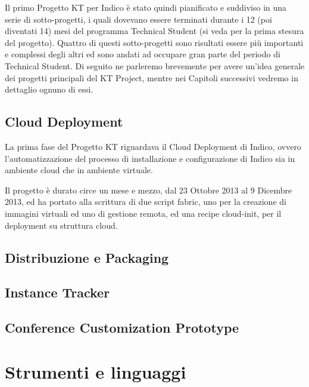     	Il primo Progetto KT per Indico è stato quindi pianificato e suddiviso in una serie di sotto-progetti, i quali dovevano essere terminati durante i 12 (poi diventati 14) mesi del programma Technical Student (si veda \cite{pedro:gist} per la prima stesura del progetto). Quattro di questi sotto-progetti sono risultati essere più importanti e complessi degli altri ed sono andati ad occupare gran parte del periodo di Technical Student. Di seguito ne parleremo brevemente per avere un'idea generale dei progetti principali del KT Project, mentre nei Capitoli successivi vedremo in dettaglio ognuno di essi.
    	
    	\subsection{Cloud Deployment} \label{subsec:p;pp;cloud}
    	
        	La prima fase del Progetto KT riguardava il Cloud Deployment di Indico, ovvero l'automatizzazione del processo di installazione e configurazione di Indico sia in ambiente cloud che in ambiente virtuale.
        	
        	Il progetto è durato circe un mese e mezzo, dal 23 Ottobre 2013 al 9 Dicembre 2013, ed ha portato alla scrittura di due script fabric, uno per la creazione di immagini virtuali ed uno di gestione remota, ed una recipe cloud-init, per il deployment su struttura cloud.
    	
    	\subsection{Distribuzione e Packaging} \label{subsec:p;pp:distribuzione}
    	
    	\subsection{Instance Tracker} \label{subsec:p;pp;instance_tracker}
    	
    	\subsection{Conference Customization Prototype} \label{subsec:p;pp;conference_customization_prototype}
    	
    \section{Strumenti e linguaggi} \label{sec:p;strumenti_linguaggi}
    
